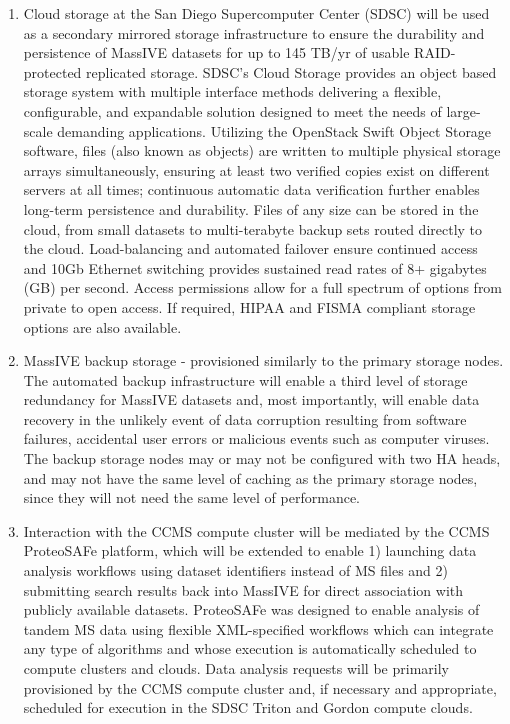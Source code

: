 \documentclass[arial,11pt]{article}
\begin{document}
\begin{enumerate}
\item Cloud storage at the San Diego Supercomputer Center (SDSC) will be used as a secondary mirrored storage infrastructure to ensure the durability and persistence of MassIVE datasets for up to 145 TB/yr of usable RAID-protected replicated storage. SDSC's Cloud Storage provides an object based storage system with multiple interface methods delivering a flexible, configurable, and expandable solution designed to meet the needs of large-scale demanding applications. Utilizing the OpenStack Swift Object Storage software, files (also known as objects) are written to multiple physical storage arrays simultaneously, ensuring at least two verified copies exist on different servers at all times; continuous automatic data verification further enables long-term persistence and durability. Files of any size can be stored in the cloud, from small datasets to multi-terabyte backup sets routed directly to the cloud.
 Load-balancing and automated failover ensure continued access and 10Gb Ethernet switching provides sustained read rates of 8+ gigabytes (GB) per second. Access permissions allow for a full spectrum of options from private to open access. If required, HIPAA and FISMA compliant storage options are also available.

\item MassIVE backup storage - provisioned similarly to the primary storage nodes. The automated backup infrastructure will enable a third level of storage redundancy for MassIVE datasets and, most importantly, will enable data recovery in the unlikely event of data corruption resulting from software failures, accidental user errors or malicious events such as computer viruses. The backup storage nodes may or may not be configured with two HA heads, and may not have the same level of caching as the primary storage nodes, since they will not need the same level of performance.

\item Interaction with the CCMS compute cluster will be mediated by the CCMS ProteoSAFe platform, which will be extended to enable 1) launching data analysis workflows using dataset identifiers instead of MS  files and 2) submitting search results back into MassIVE for direct association with publicly available datasets. ProteoSAFe was designed to enable analysis of tandem MS  data using flexible XML-specified workflows which can integrate any type of algorithms and whose execution is automatically scheduled to compute clusters and clouds. Data analysis requests will be primarily provisioned by the CCMS compute cluster and, if necessary and appropriate, scheduled for execution in the SDSC Triton and Gordon compute clouds.
\end{enumerate}
\end{document}

